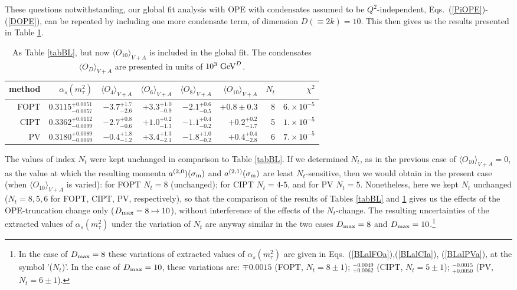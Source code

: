 \documentclass[aps,nofootinbib,showkeys,noshowpacs,preprintnumbers,amsmath,amssymb]{revtex4}
\newcommand{\sm}{{\sigma_{\rm m}}}
\begin{document}
These questions notwithstanding, our global fit analysis with OPE with condensates assumed to be $Q^2$-independent, Eqs.~(\ref{PiOPE})-(\ref{DOPE}), can be repeated by including one more condensate term, of dimension $D (\equiv 2 k)=10$. This then gives us the results presented in Table \ref{tabBLO10}.
\begin{table}
  \caption{As Table \ref{tabBL}, but now $\langle O_{10} \rangle_{V+A}$ is included in the global fit. The condensates $\langle O_D \rangle_{V+A}$ are presented in units of $10^3 \ {\rm GeV}^D$.}
 \label{tabBLO10}
\begin{ruledtabular}
\begin{tabular}{r|rrrrr|r|r}
  method & $\alpha_s(m_{\tau}^2)$ &  $\langle O_4 \rangle_{V+A}$  & $\langle O_6 \rangle_{V+A}$  & $\langle O_8 \rangle_{V+A}$  & $\langle O_{10} \rangle_{V+A}$ & $N_t$ & $\chi^2$ \\
\hline
FOPT       &  $0.3115^{+0.0051}_{-0.0057}$      & $-3.7^{+1.7}_{-2.6}$   &  $+3.3^{+1.0}_{-0.9}$  &  $-2.1^{+0.6}_{-0.5}$ &  $+0.8 \pm 0.3$ & 8 & $6. \times 10^{-5}$ \\
CIPT      &   $0.3362^{+0.0112}_{-0.0099}$ &  $-2.7^{+0.8}_{-0.6}$ & $+1.0^{+0.2}_{-1.3}$ & $-1.1^{+0.4}_{-0.2}$  & $+0.2^{+0.2}_{-1.7}$& 5 &  $1. \times 10^{-5}$ \\
PV      &  $0.3180^{+0.0089}_{-0.0069}$ & $-0.4^{+1.8}_{-1.2}$ & $+3.4^{+1.3}_{-2.1}$ & $-1.8^{+1.0}_{-0.2}$ & $+0.4^{+0.4}_{-2.8}$ & 6 &  $7. \times 10^{-5}$
\end{tabular}
\end{ruledtabular}
\end{table}
The values of index $N_t$ were kept unchanged in comparison to Table \ref{tabBL}. If we determined $N_t$, as in the previous case of $\langle O_{10} \rangle_{V+A}=0$, as the value at which the resulting momenta $a^{(2,0})(\sm)$ and $a^{(2,1)}(\sm)$ are least $N_t$-sensitive, then we would obtain in the present case (when $\langle O_{10} \rangle_{V+A}$ is varied): for FOPT $N_t=8$ (unchanged); for CIPT $N_t=4$-$5$, and for PV $N_t=5$. Nonetheless, here we kept $N_t$ unchanged ($N_t=8, 5, 6$ for FOPT, CIPT, PV, respectively), so that the comparison of the results of Tables \ref{tabBL} and \ref{tabBLO10} gives us the effects of the OPE-truncation change only ($D_{\rm max}=8 \mapsto 10$), without interference of the effects of the $N_t$-change. The resulting uncertainties of the extracted values of $\alpha_s(m_{\tau}^2)$ under the variation of $N_t$ are anyway similar in the two cases $D_{\rm max}=8$ and $D_{\rm max}=10$.\footnote{In the case of $D_{\rm max}=8$ these variations of extracted values of $\alpha_s(m_{\tau}^2)$ are given in Eqs.~(\ref{BLalFOa}),(\ref{BLalCIa}), (\ref{BLalPVa}), at the symbol '($N_t$)'. In the case of $D_{\rm max}=10$, these variations are: $\mp 0.0015$ (FOPT, $N_t=8 \pm 1$); $^{-0.0049}_{+0.0062}$ (CIPT, $N_t=5 \pm 1$); $^{-0.0015}_{+0.0050}$ (PV, $N_t=6 \pm 1$).}
\end{document}
